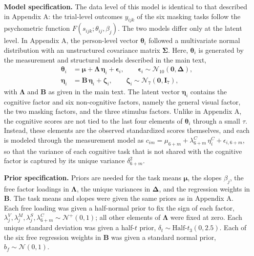 \documentclass[
  ,man]{apa6}
\begin{document}
\textbf{Model specification.} The data level of this model is identical to that described in Appendix A: the trial-level outcomes \(y_{ijk}\) of the six masking tasks follow the psychometric function \(F(s_{ijk}; \theta_{ij}, \beta_j)\). The two models differ only at the latent level. In Appendix A, the person-level vector \(\boldsymbol{\theta}_i\) followed a multivariate normal distribution with an unstructured covariance matrix \(\boldsymbol{\Sigma}\). Here, \(\boldsymbol{\theta}_i\) is generated by the measurement and structural models described in the main text,
\[
\begin{aligned}
\boldsymbol{\theta}_i &= \boldsymbol{\mu} + \boldsymbol{\Lambda}\,\boldsymbol{\eta}_i + \boldsymbol{\epsilon}_i,
\qquad \boldsymbol{\epsilon}_i \sim \mathcal{N}_{10}\!\left(\mathbf{0}, \boldsymbol{\Delta}\right), \\
\boldsymbol{\eta}_i &= \mathbf{B}\,\boldsymbol{\eta}_i + \boldsymbol{\zeta}_i,
\qquad \boldsymbol{\zeta}_i \sim \mathcal{N}_{7}\!\left(\mathbf{0}, \mathbf{I}_7\right),
\end{aligned}
\]
with \(\boldsymbol{\Lambda}\) and \(\mathbf{B}\) as given in the main text. The latent vector \(\boldsymbol{\eta}_i\) contains the cognitive factor and six non-cognitive factors, namely the general visual factor, the two masking factors, and the three stimulus factors. Unlike in Appendix A, the cognitive scores are not tied to the last four elements of \(\boldsymbol{\theta}_i\) through a small \(\tau\). Instead, these elements are the observed standardized scores themselves, and each is modeled through the measurement model as \(c_{im} = \mu_{6+m} + \lambda_{6+m}^{C}\,\eta_i^{C} + \epsilon_{i,6+m}\), so that the variance of each cognitive task that is not shared with the cognitive factor is captured by its unique variance \(\delta_{6+m}^2\).

\textbf{Prior specification.} Priors are needed for the task means \(\boldsymbol{\mu}\), the slopes \(\beta_j\), the free factor loadings in \(\boldsymbol{\Lambda}\), the unique variances in \(\boldsymbol{\Delta}\), and the regression weights in \(\mathbf{B}\). The task means and slopes were given the same priors as in Appendix A. Each free loading was given a half-normal prior to fix the sign of each factor, \(\lambda_j^{V}, \lambda_j^{M}, \lambda_j^{S}, \lambda_{6+m}^{C} \sim \mathcal{N}^{+}(0, 1)\); all other elements of \(\boldsymbol{\Lambda}\) were fixed at zero. Each unique standard deviation was given a half-\(t\) prior, \(\delta_t \sim \text{Half-}t_3(0, 2.5)\). Each of the six free regression weights in \(\mathbf{B}\) was given a standard normal prior, \(b_f \sim \mathcal{N}(0, 1)\).
\end{document}
